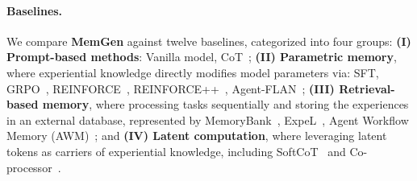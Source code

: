 \documentclass[]{fairmeta}
\newcommand{\ourmethod}{{\fontfamily{lmtt}\selectfont \textbf{MemGen}}\xspace}
\newcommand{\llmname}[1]{{\fontfamily{pcr}\selectfont {#1}}\xspace}
\begin{document}
\vspace{-0.8em}
\paragraph{Baselines.} We compare \ourmethod against twelve baselines, categorized into four groups: \textbf{(I) Prompt-based methods}: Vanilla model, CoT~\citep{wei2023chainofthoughtpromptingelicitsreasoning}; \textbf{(II) Parametric memory}, where experiential knowledge directly modifies model parameters via: SFT, GRPO~\citep{deepseekai2025deepseekr1incentivizingreasoningcapability}, REINFORCE~\citep{williams1992simple}, REINFORCE++~\citep{hu2025reinforceefficientrlhfalgorithm}, Agent-FLAN~\citep{chen2024agentflandesigningdatamethods}; \textbf{(III) Retrieval-based memory}, where processing tasks sequentially and storing the experiences in an external database, represented by MemoryBank~\citep{zhong2023memorybankenhancinglargelanguage}, ExpeL~\citep{zhao2024expelllmagentsexperiential}, Agent Workflow Memory (AWM)~\citep{wang2024agentworkflowmemory}; and \textbf{(IV) Latent computation}, where leveraging latent tokens as carriers of experiential knowledge, including SoftCoT~\citep{xu2025softcottesttimescalingsoft} and Co-processor~\citep{liu2024deliberation}. %
\end{document}
